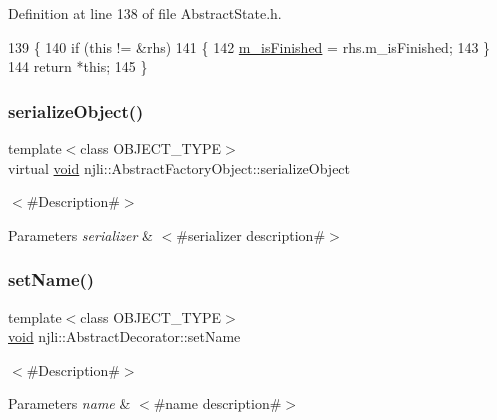 Definition at line 138 of file Abstract\+State.\+h.


\begin{DoxyCode}
139   \{
140     \textcolor{keywordflow}{if} (\textcolor{keyword}{this} != &rhs)
141       \{
142         \mbox{\hyperlink{classnjli_1_1_abstract_state_a445a5d1ac7572b8b01b81937c89e960c}{m\_isFinished}} = rhs.m\_isFinished;
143       \}
144     \textcolor{keywordflow}{return} *\textcolor{keyword}{this};
145   \}
\end{DoxyCode}
\mbox{\label{classnjli_1_1_abstract_state_a4fc4bcd9d1930911474210c047372fc0}} 
\subsubsection{\texorpdfstring{serialize\+Object()}{serializeObject()}}
{\footnotesize\ttfamily template$<$class O\+B\+J\+E\+C\+T\+\_\+\+T\+Y\+PE$>$ \\
virtual \mbox{\hyperlink{_thread_8h_af1e856da2e658414cb2456cb6f7ebc66}{void}} njli\+::\+Abstract\+Factory\+Object\+::serialize\+Object}

$<$\#\+Description\#$>$


\begin{DoxyParams}{Parameters}
{\em serializer} & $<$\#serializer description\#$>$ \\
\hline
\end{DoxyParams}
\mbox{\label{classnjli_1_1_abstract_state_a087eb5f8d9f51cc476f12f1d10a3cb95}} 
\subsubsection{\texorpdfstring{set\+Name()}{setName()}}
{\footnotesize\ttfamily template$<$class O\+B\+J\+E\+C\+T\+\_\+\+T\+Y\+PE$>$ \\
\mbox{\hyperlink{_thread_8h_af1e856da2e658414cb2456cb6f7ebc66}{void}} njli\+::\+Abstract\+Decorator\+::set\+Name}

$<$\#\+Description\#$>$


\begin{DoxyParams}{Parameters}
{\em name} & $<$\#name description\#$>$ \\
\hline
\end{DoxyParams}
\mbox{\label{classnjli_1_1_abstract_state_aa1d0341a1b1bd83f9b722488680537ad}} 
